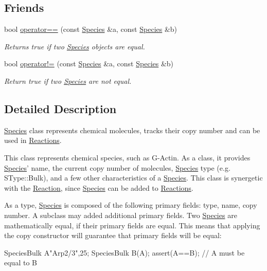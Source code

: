 \subsection*{Friends}
\begin{DoxyCompactItemize}
\item 
bool \hyperlink{classchem_1_1Species_a22987c5719b74c50465256ea5b9d80bf}{operator==} (const \hyperlink{classchem_1_1Species}{Species} \&a, const \hyperlink{classchem_1_1Species}{Species} \&b)
\begin{DoxyCompactList}\small\item\em Returns true if two \hyperlink{classchem_1_1Species}{Species} objects are equal. \end{DoxyCompactList}\item 
bool \hyperlink{classchem_1_1Species_aff630d716711fbbab3bc7f598230316b}{operator!=} (const \hyperlink{classchem_1_1Species}{Species} \&a, const \hyperlink{classchem_1_1Species}{Species} \&b)
\begin{DoxyCompactList}\small\item\em Return true if two \hyperlink{classchem_1_1Species}{Species} are not equal. \end{DoxyCompactList}\end{DoxyCompactItemize}


\subsection{Detailed Description}
\hyperlink{classchem_1_1Species}{Species} class represents chemical molecules, tracks their copy number and can be used in \hyperlink{classchem_1_1Reaction}{Reactions}. 

This class represents chemical species, such as G-\/\-Actin. As a class, it provides \hyperlink{classchem_1_1Species}{Species}' name, the current copy number of molecules, \hyperlink{classchem_1_1Species}{Species} type (e.\-g. S\-Type\-::\-Bulk), and a few other characteristics of a \hyperlink{classchem_1_1Species}{Species}. This class is synergetic with the \hyperlink{classchem_1_1Reaction}{Reaction}, since \hyperlink{classchem_1_1Species}{Species} can be added to \hyperlink{classchem_1_1Reaction}{Reactions}.

As a type, \hyperlink{classchem_1_1Species}{Species} is composed of the following primary fields\-: type, name, copy number. A subclass may added additional primary fields. Two \hyperlink{classchem_1_1Species}{Species} are mathematically equal, if their primary fields are equal. This means that applying the copy constructor will guarantee that primary fields will be equal\-: 
\begin{DoxyCode}
  SpeciesBulk A{"Arp2/3",25};
  SpeciesBulk B(A);
  assert(A==B); // A must be equal to B
\end{DoxyCode}


